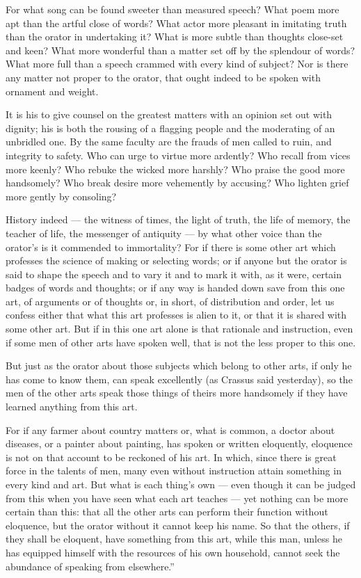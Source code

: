  For what song can be found sweeter than measured speech? What poem more apt than the artful close of words? What actor more pleasant in imitating truth than the orator in undertaking it? What is more subtle than thoughts close-set and keen? What more wonderful than a matter set off by the splendour of words? What more full than a speech crammed with every kind of subject? Nor is there any matter not proper to the orator, that ought indeed to be spoken with ornament and weight.

 It is his to give counsel on the greatest matters with an opinion set out with dignity; his is both the rousing of a flagging people and the moderating of an unbridled one. By the same faculty are the frauds of men called to ruin, and integrity to safety. Who can urge to virtue more ardently? Who recall from vices more keenly? Who rebuke the wicked more harshly? Who praise the good more handsomely? Who break desire more vehemently by accusing? Who lighten grief more gently by consoling?

 History indeed — the witness of times, the light of truth, the life of memory, the teacher of life, the messenger of antiquity — by what other voice than the orator's is it commended to immortality? For if there is some other art which professes the science of making or selecting words; or if anyone but the orator is said to shape the speech and to vary it and to mark it with, as it were, certain badges of words and thoughts; or if any way is handed down save from this one art, of arguments or of thoughts or, in short, of distribution and order, let us confess either that what this art professes is alien to it, or that it is shared with some other art. But if in this one art alone is that rationale and instruction, even if some men of other arts have spoken well, that is not the less proper to this one.

 But just as the orator about those subjects which belong to other arts, if only he has come to know them, can speak excellently (as Crassus said yesterday), so the men of the other arts speak those things of theirs more handsomely if they have learned anything from this art.

 For if any farmer about country matters or, what is common, a doctor about diseases, or a painter about painting, has spoken or written eloquently, eloquence is not on that account to be reckoned of his art. In which, since there is great force in the talents of men, many even without instruction attain something in every kind and art. But what is each thing's own — even though it can be judged from this when you have seen what each art teaches — yet nothing can be more certain than this: that all the other arts can perform their function without eloquence, but the orator without it cannot keep his name. So that the others, if they shall be eloquent, have something from this art, while this man, unless he has equipped himself with the resources of his own household, cannot seek the abundance of speaking from elsewhere.''

